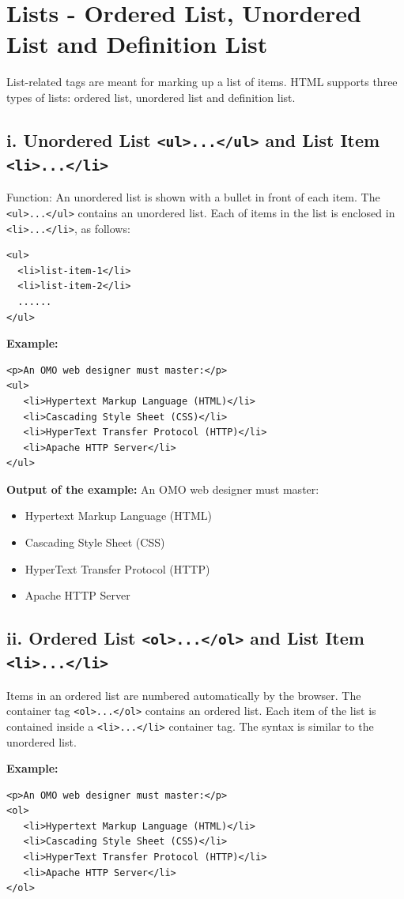 \documentclass[12pt,a4paper]{article}
\begin{document}
\section*{Lists - Ordered List, Unordered List and Definition List}
List-related tags are meant for marking up a list of items. HTML supports three types of lists: ordered list, unordered list and definition list.

\subsection*{i. Unordered List \texttt{<ul>...</ul>} and List Item \texttt{<li>...</li>}}
Function: An unordered list is shown with a bullet in front of each item. The \texttt{<ul>...</ul>} contains an unordered list. Each of items in the list is enclosed in \texttt{<li>...</li>}, as follows:

\begin{verbatim}
<ul>
  <li>list-item-1</li>
  <li>list-item-2</li>
  ......
</ul>
\end{verbatim}

\textbf{Example:}
\begin{verbatim}
<p>An OMO web designer must master:</p>
<ul>
   <li>Hypertext Markup Language (HTML)</li>
   <li>Cascading Style Sheet (CSS)</li>
   <li>HyperText Transfer Protocol (HTTP)</li>
   <li>Apache HTTP Server</li>
</ul>
\end{verbatim}

\textbf{Output of the example:}
An OMO web designer must master:
\begin{itemize}
    \item Hypertext Markup Language (HTML)
    \item Cascading Style Sheet (CSS)
    \item HyperText Transfer Protocol (HTTP)
    \item Apache HTTP Server
\end{itemize}

\subsection*{ii. Ordered List \texttt{<ol>...</ol>} and List Item \texttt{<li>...</li>}}
Items in an ordered list are numbered automatically by the browser. The container tag \texttt{<ol>...</ol>} contains an ordered list. Each item of the list is contained inside a \texttt{<li>...</li>} container tag. The syntax is similar to the unordered list.

\textbf{Example:}
\begin{verbatim}
<p>An OMO web designer must master:</p>
<ol>
   <li>Hypertext Markup Language (HTML)</li>
   <li>Cascading Style Sheet (CSS)</li>
   <li>HyperText Transfer Protocol (HTTP)</li>
   <li>Apache HTTP Server</li>
</ol>
\end{verbatim}
\end{document}

